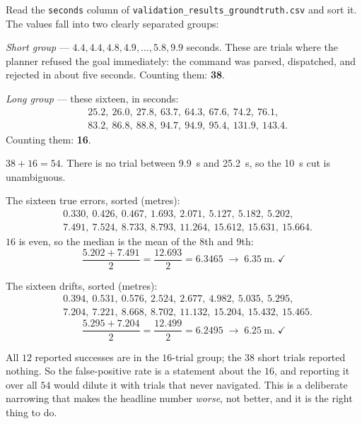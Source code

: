 \documentclass[11pt,a4paper]{report}
\newcommand{\file}[1]{\texttt{\small #1}}
\begin{document}
\begin{handbox}
Read the \file{seconds} column of \file{validation\_results\_groundtruth.csv}
and sort it. The values fall into two clearly separated groups:

\emph{Short group} --- $4.4, 4.4, 4.8, 4.9, \ldots, 5.8, 9.9$ seconds. These
are trials where the planner refused the goal immediately: the command was
parsed, dispatched, and rejected in about five seconds. Counting them:
\textbf{38}.

\emph{Long group} --- these sixteen, in seconds:
\[
\begin{aligned}
&25.2,\ 26.0,\ 27.8,\ 63.7,\ 64.3,\ 67.6,\ 74.2,\ 76.1,\\
&83.2,\ 86.8,\ 88.8,\ 94.7,\ 94.9,\ 95.4,\ 131.9,\ 143.4 .
\end{aligned}
\]
Counting them: \textbf{16}.

$38 + 16 = 54$. \checkmark\; There is no trial between \SI{9.9}{\second} and
\SI{25.2}{\second}, so the \SI{10}{\second} cut is unambiguous.
\end{handbox}

\begin{handbox}
The sixteen true errors, sorted (metres):
\[
\begin{aligned}
&0.330,\ 0.426,\ 0.467,\ 1.693,\ 2.071,\ 5.127,\ 5.182,\ \mathbf{5.202},\\
&\mathbf{7.491},\ 7.524,\ 8.733,\ 8.793,\ 11.264,\ 15.612,\ 15.631,\ 15.664 .
\end{aligned}
\]
$16$ is even, so the median is the mean of the $8$th and $9$th:
\[
\frac{5.202 + 7.491}{2} = \frac{12.693}{2} = 6.3465 \;\rightarrow\; \SI{6.35}{\metre}. \;\checkmark
\]
\end{handbox}

\begin{handbox}
The sixteen drifts, sorted (metres):
\[
\begin{aligned}
&0.394,\ 0.531,\ 0.576,\ 2.524,\ 2.677,\ 4.982,\ 5.035,\ \mathbf{5.295},\\
&\mathbf{7.204},\ 7.221,\ 8.668,\ 8.702,\ 11.132,\ 15.204,\ 15.432,\ 15.465 .
\end{aligned}
\]
\[
\frac{5.295 + 7.204}{2} = \frac{12.499}{2} = 6.2495 \;\rightarrow\; \SI{6.25}{\metre}. \;\checkmark
\]
\end{handbox}

\begin{keyidea}
All $12$ reported successes are in the $16$-trial group; the $38$ short trials
reported nothing. So the false-positive rate is a statement about the $16$, and
reporting it over all $54$ would dilute it with trials that never navigated.
This is a deliberate narrowing that makes the headline number \emph{worse}, not
better, and it is the right thing to do.
\end{keyidea}
\end{document}
